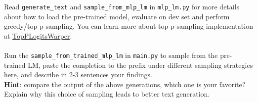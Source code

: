 \noindent Read \texttt{generate\_text} and \texttt{sample\_from\_mlp\_lm} in \texttt{mlp\_lm.py} for more details about how to load the pre-trained model, evaluate on dev set and perform greedy/top-p sampling. You can learn more about top-p sampling implementation at \href{https://huggingface.co/docs/transformers/v4.37.2/en/internal/generation_utils#transformers.TopPLogitsWarper}{TopPLogitsWarper}.\\\\
\noindent \todo{} Run the \texttt{sample\_from\_trained\_mlp\_lm} in \texttt{main.py} to sample from the pre-trained LM, paste the completion to the prefix under different sampling strategies here, and describe in 2-3 sentences your findings.\\
\noindent \textbf{Hint}: compare the output of the above generations, which one is your favorite? Explain why this choice of sampling leads to better text generation.

\noindent {}








